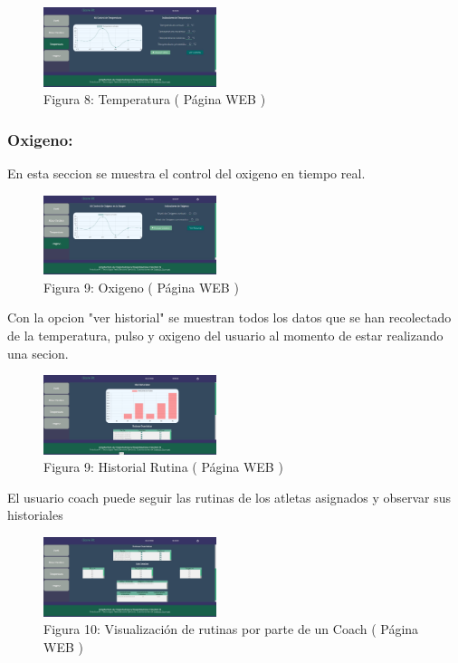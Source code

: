 \documentclass[osajnl,twocolumn,showpacs,superscriptaddress,10pt]{revtex4-1}
\begin{document}
\begin{figure} [H] \centering 
\caption{Figura 8: Temperatura ( Página WEB )}
\includegraphics[width=0.45\textwidth]{temp.jpg}
\end{figure}

\subsubsection{Oxigeno:}
    En esta seccion se muestra el control del oxigeno en tiempo real.
    
\begin{figure} [H] \centering 
\caption{Figura 9: Oxigeno ( Página WEB )}
\includegraphics[width=0.45\textwidth]{oxig.jpg}
\end{figure}


    Con la opcion "ver historial" se muestran todos los datos que se han recolectado de la temperatura, pulso y oxigeno del usuario al momento de estar realizando una secion.
    
\begin{figure} [H] \centering 
\caption{Figura 9: Historial Rutina ( Página WEB )}
\includegraphics[width=0.45\textwidth]{hist.jpg}
\end{figure}

    El usuario coach puede seguir las rutinas de los atletas asignados y observar sus historiales
    
\begin{figure} [H] \centering 
\caption{Figura 10: Visualización de rutinas por parte de un Coach ( Página WEB )}
\includegraphics[width=0.45\textwidth]{HistAtle.jpg}
\end{figure}
\end{document}
